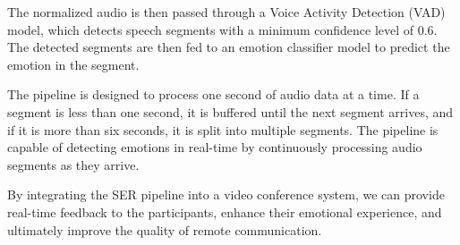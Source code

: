 The normalized audio is then passed through a Voice Activity Detection (VAD) model, which detects speech segments with a minimum confidence level of 0.6. The detected segments are then fed to an emotion classifier model to predict the emotion in the segment.

The pipeline is designed to process one second of audio data at a time. If a segment is less than one second, it is buffered until the next segment arrives, and if it is more than six seconds, it is split into multiple segments. The pipeline is capable of detecting emotions in real-time by continuously processing audio segments as they arrive.

By integrating the SER pipeline into a video conference system, we can provide real-time feedback to the participants, enhance their emotional experience, and ultimately improve the quality of remote communication.

